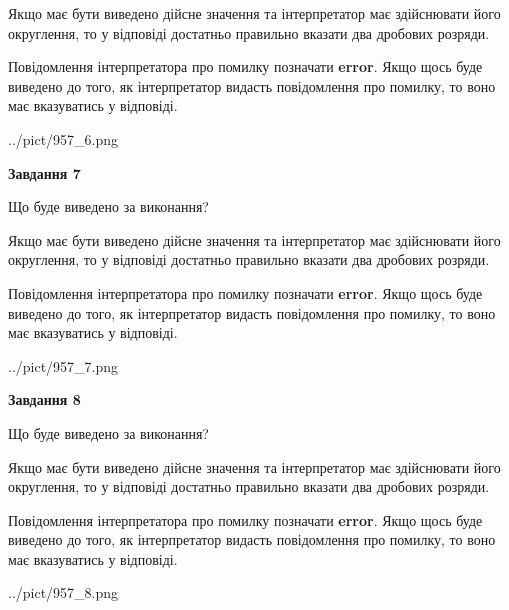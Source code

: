 \documentclass[12pt, ukrainian]{article}
\begin{document}
{\begin {Large}
Якщо має бути виведено дійсне значення та інтерпретатор має здійснювати його округлення, 
то у відповіді достатньо правильно вказати два дробових розряди.

Повідомлення інтерпретатора про помилку позначати \textbf{error}.
Якщо щось буде виведено до того, як інтерпретатор видасть повідомлення про помилку, 
то воно має вказуватись у відповіді. \par

\begin{center}
	{../pict/957_6.png}
\end{center}
\newpage

{\begin {center}\textbf{Завдання 7}\end {center}}\par
Що буде виведено за виконання? \par

Якщо має бути виведено дійсне значення та інтерпретатор має здійснювати його округлення, 
то у відповіді достатньо правильно вказати два дробових розряди.

Повідомлення інтерпретатора про помилку позначати \textbf{error}.
Якщо щось буде виведено до того, як інтерпретатор видасть повідомлення про помилку, 
то воно має вказуватись у відповіді. \par

\begin{center}
	{../pict/957_7.png}
\end{center}
\newpage

{\begin {center}\textbf{Завдання 8}\end {center}}\par
Що буде виведено за виконання? \par

Якщо має бути виведено дійсне значення та інтерпретатор має здійснювати його округлення, 
то у відповіді достатньо правильно вказати два дробових розряди.

Повідомлення інтерпретатора про помилку позначати \textbf{error}.
Якщо щось буде виведено до того, як інтерпретатор видасть повідомлення про помилку, 
то воно має вказуватись у відповіді. \par

\begin{center}
	{../pict/957_8.png}
\end{center}
\newpage


\end{Large}}
\end{document}
